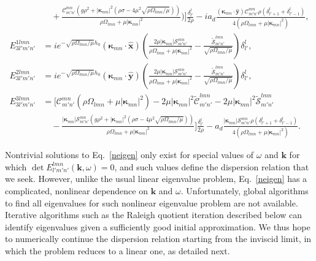\documentclass[aps,pre,amsmath,amssymb,floatfix,onecolumn,notitlepage,10pt]{revtex4-1}
\begin{document}
\begin{align}
&\quad + \frac{\mathcal{C}_{m' n'}^{m n} \left(g \rho ^2+\left\lvert \bm{\kappa}_{m n} \right\rvert^2 \left(\rho  \sigma -4 \mu ^2 \sqrt{{\rho  \Omega _{l m n}}/{\mu }}\right)\right)}{\rho  \Omega _{l m n}+\mu  \left\lvert \bm{\kappa}_{m n} \right\rvert^2}\Bigg) \Bigg] \frac{\delta^l_{l'}}{2\rho} - i a_d \frac{\left( \bm{\kappa}_{mn}\cdot\hat{\mathbf{y}} \right) \mathcal{C}_{m' n'}^{m n} \rho \left(\delta^l_{l'+1}+\delta^l_{l'-1}\right)}{4\left(\rho  \Omega _{l m n}+\mu  \left\lvert \bm{\kappa}_{m n} \right\rvert^2\right)}, \\
E_{3l'm'n'}^{1lmn} &=i e^ {-\sqrt{{\rho  \Omega _{l m n}}/{\mu }}h_0} \left( \bm{\kappa}_{mn}\cdot\hat{\mathbf{x}} \right) \left(\frac{2 \mu  \left\lvert \bm{\kappa}_{m n} \right\rvert \mathcal{S}_{m' n'}^{m n}}{\rho  \Omega _{l m n}+\mu  \left\lvert \bm{\kappa}_{m n} \right\rvert^2}-\frac{\tilde{\mathcal{S}}_{m' n'}^{l m n}}{\sqrt{{\rho  \Omega _{l m n}}/{\mu }}}\right) \delta^l_{l'},  \\
E_{3l'm'n'}^{2lmn} &=i e^ {-\sqrt{{\rho  \Omega _{l m n}}/{\mu }}h_0} \left( \bm{\kappa}_{mn}\cdot\hat{\mathbf{y}} \right) \left(\frac{2 \mu  \left\lvert \bm{\kappa}_{m n} \right\rvert \mathcal{S}_{m' n'}^{m n}}{\rho  \Omega _{l m n}+\mu  \left\lvert \bm{\kappa}_{m n} \right\rvert^2}-\frac{\tilde{\mathcal{S}}_{m' n'}^{l m n}}{\sqrt{{\rho  \Omega _{l m n}}/{\mu }}}\right) \delta^l_{l'}, \\
E_{3l'm'n'}^{3lmn} &= \Bigg[\mathcal{C}_{m' n'}^{m n} \left(\rho  \Omega _{l m n}+\mu  \left\lvert \bm{\kappa}_{m n} \right\rvert^2\right)-2 \mu  \left\lvert \bm{\kappa}_{m n} \right\rvert^2 \tilde{\mathcal{C}}_{m' n'}^{l m n} -2 \mu  \left\lvert \bm{\kappa}_{m n} \right\rvert^2 \tilde{\mathcal{S}}_{m' n'}^{l m n} \nonumber \\
&\quad-\frac{\left\lvert \bm{\kappa}_{m n} \right\rvert \mathcal{S}_{m' n'}^{m n} \left(g \rho ^2+\left\lvert \bm{\kappa}_{m n} \right\rvert^2 \left(\rho  \sigma -4 \mu ^2 \sqrt{{\rho  \Omega _{l m n}}/{\mu }}\right)\right)}{\rho  \Omega _{l m n}+\mu  \left\lvert \bm{\kappa}_{m n} \right\rvert^2}\Bigg]  \frac{\delta^l_{l'}}{2\rho} -a_d\frac{\left\lvert \bm{\kappa}_{m n} \right\rvert \mathcal{S}_{m' n'}^{m n} \rho \left(\delta^l_{l'+1}+\delta^l_{l'-1}\right)}{4\left(\rho  \Omega _{l m n}+\mu  \left\lvert \bm{\kappa}_{m n} \right\rvert^2\right)}.
\end{align}

Nontrivial solutions to Eq.~\eqref{neigen} only exist for special values of $\omega$ and $\mathbf{k}$ for which $\det E_{l'm'n'}^{lmn}(\mathbf{k},\omega)=0$, and such values define the dispersion relation that we seek. However, unlike the usual linear eigenvalue problem, Eq.~\eqref{neigen} has a complicated, nonlinear dependence on $\mathbf{k}$ and $\omega$. Unfortunately, global algorithms to find all eigenvalues for such nonlinear eigenvalue problem are not available. Iterative algorithms such as the Raleigh quotient iteration described below can identify eigenvalues given a sufficiently good initial approximation. We thus hope to numerically continue the dispersion relation starting from the inviscid limit, in which the problem reduces to a linear one, as detailed next.
\end{document}
